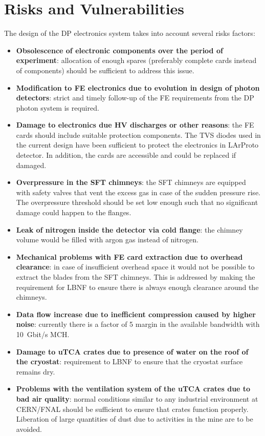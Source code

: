 

\section{Risks and Vulnerabilities}
\label{sec:fddp-tpc-elec-risks}

The design of the DP electronics system takes into account several risks factors:
\begin{itemize}
\item{\textbf{Obsolescence of electronic components over the period of experiment}: allocation of enough spares (preferably complete cards instead of components) should be sufficient to address this issue. }
\item{\textbf{Modification to FE electronics due to evolution in design of photon detectors}: strict and timely follow-up of the FE requirements from the DP photon system is required.}
\item{\textbf{Damage to electronics due HV discharges or other reasons}: the FE cards should include suitable protection components. The TVS diodes used in the current design have been sufficient to protect the electronics in LArProto detector. In addition, the cards are accessible and could be replaced if damaged. }
\item{\textbf{Overpressure in the SFT chimneys}: the SFT chimneys are equipped with safety valves that vent the excess gas in case of the sudden pressure rise. The overpressure threshold should be set low enough such that no significant damage could happen to the flanges. }
\item{\textbf{Leak of nitrogen inside the detector via cold flange}: the chimney volume would be filled with argon gas instead of nitrogen.}
\item{\textbf{Mechanical problems with FE card extraction due to overhead clearance}: in case of insufficient overhead space it would not be possible to extract the blades from the SFT chimneys. This is addressed by making the requirement for LBNF to ensure there is always enough clearance around the chimneys.}
\item{\textbf{Data flow increase due to inefficient compression caused by higher noise}: currently there is a factor of \num{5} margin in the available bandwidth with \SI{10}{Gbit/s} MCH.}
\item{\textbf{Damage to uTCA crates due to presence of water on the roof of the cryostat}: requirement to LBNF to ensure that the cryostat surface remains dry.}
\item{\textbf{Problems with the ventilation system of the uTCA crates due to bad air quality}: normal conditions similar to any industrial environment at CERN/FNAL should be sufficient to ensure that crates function properly. Liberation of large quantities of dust due to activities in the mine are to be avoided.}
\end{itemize}
